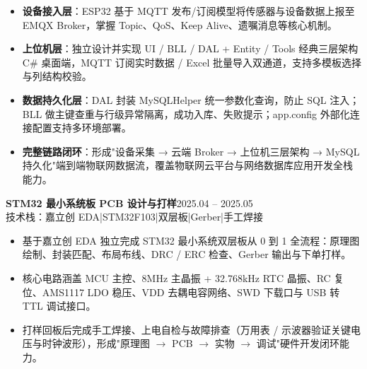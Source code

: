\documentclass[10pt,a4paper]{article}
\newcommand{\projectblock}[3]{%
    {\bfseries\color{darktext}#1}\hfill{\color{graytext}#2}\\%
    {\small\color{graytext}#3}%
    \vspace{0.2em}%
}
\begin{document}
\begin{itemize}[leftmargin=1.5em, itemsep=2pt, parsep=0pt, topsep=2pt]
    \item \textbf{设备接入层}：ESP32 基于 MQTT 发布/订阅模型将传感器与设备数据上报至 EMQX Broker，掌握 Topic、QoS、Keep Alive、遗嘱消息等核心机制。
    \item \textbf{上位机层}：独立设计并实现 UI / BLL / DAL + Entity / Tools 经典三层架构 C\# 桌面端，MQTT 订阅实时数据 / Excel 批量导入双通道，支持多模板选择与列结构校验。
    \item \textbf{数据持久化层}：DAL 封装 MySQLHelper 统一参数化查询，防止 SQL 注入；BLL 做主键查重与行级异常隔离，成功入库、失败提示；app.config 外部化连接配置支持多环境部署。
    \item \textbf{完整链路闭环}：形成"设备采集 → 云端 Broker → 上位机三层架构 → MySQL 持久化"端到端物联网数据流，覆盖物联网云平台与网络数据库应用开发全栈能力。
\end{itemize}

\vspace{0.15em}

\projectblock{STM32 最小系统板 PCB 设计与打样}{2025.04 -- 2025.05}{技术栈：嘉立创 EDA\hspace{0.3em}|\hspace{0.3em}STM32F103\hspace{0.3em}|\hspace{0.3em}双层板\hspace{0.3em}|\hspace{0.3em}Gerber\hspace{0.3em}|\hspace{0.3em}手工焊接}

\begin{itemize}[leftmargin=1.5em, itemsep=2pt, parsep=0pt, topsep=2pt]
    \item 基于嘉立创 EDA 独立完成 STM32 最小系统双层板从 0 到 1 全流程：原理图绘制、封装匹配、布局布线、DRC / ERC 检查、Gerber 输出与下单打样。
    \item 核心电路涵盖 MCU 主控、8MHz 主晶振 + 32.768kHz RTC 晶振、RC 复位、AMS1117 LDO 稳压、VDD 去耦电容网络、SWD 下载口与 USB 转 TTL 调试接口。
    \item 打样回板后完成手工焊接、上电自检与故障排查（万用表 / 示波器验证关键电压与时钟波形），形成"原理图 $\to$ PCB $\to$ 实物 $\to$ 调试"硬件开发闭环能力。
\end{itemize}

\vspace{0.3em}
\end{document}
